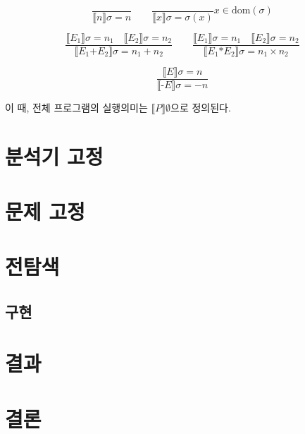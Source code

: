 \documentclass[ko]{snu-cse-bsc-thesis}
\begin{document}
\[
\frac{}{\llbracket n \rrbracket \sigma = n}
\quad\quad
\frac{}{\llbracket x \rrbracket \sigma = \sigma(x)}x \in \text{dom}(\sigma)
\]

\[
\frac{\llbracket E_1 \rrbracket \sigma = n_1 \quad \llbracket E_2 \rrbracket \sigma = n_2}
     {\llbracket E_1 \text{+} E_2 \rrbracket \sigma = n_1 + n_2}
\quad\quad
\frac{\llbracket E_1 \rrbracket \sigma = n_1 \quad \llbracket E_2 \rrbracket \sigma = n_2}
     {\llbracket E_1 \text{*} E_2 \rrbracket \sigma = n_1 \times n_2}
\]

\[
\frac{\llbracket E \rrbracket \sigma = n}
     {\llbracket \text{-}E \rrbracket \sigma = -n}
\]

이 때, 전체 프로그램의 실행의미는 $\llbracket P \rrbracket \emptyset$으로 정의된다.

\chapter{분석기 고정}\label{chap:fixed_analyzer}

\chapter{문제 고정}\label{chap:fixed_problem}

\chapter{전탐색}\label{chap:exhaustive_search}
\section{구현}\label{sec:implementation}

\chapter{결과}\label{chap:result}
\chapter{결론}\label{chap:conclusion}

\printbibliography

\begin{abstract}[en]
Given a programming language, its operational semantics, and a static analyzer, we synthesize an input program that causes the static analyzer to yield a meaningless conclusion.
A meaningless conclusion refers to a state where there is no information about the possible values of a specific variable at a specific location in the program.
In this study, we fix the G language, which has a small set of rules, and a corresponding static analyzer, to attempt an attack on the analyzer.
We prove why such an attack is always possible and present a concrete example of the attack using a full-search-based method.
Subsequently, we attempt the attack within a meaningful execution time using program synthesis techniques.
The results of this attack can help identify incomplete aspects of the static analyzer, thereby aiding in its refinement.
By creating programs that have the same operational semantics but lead to different conclusions by the static analyzer, they can be used as an obfuscation technique.
\end{abstract}
\end{document}
